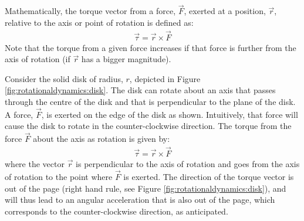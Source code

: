 Mathematically, the torque vector from a force, $\vec F$, exerted at a position, $\vec r$, relative to the axis or point of rotation is defined as:
\begin{align*}
\vec \tau = \vec r \times \vec F
\end{align*}
Note that the torque from a given force increases if that force is further from the axis of rotation (if $\vec r$ has a bigger magnitude). 

Consider the solid disk of radius, $r$, depicted in Figure \ref{fig:rotationaldynamics:disk}. The disk can rotate about an axis that passes through the centre of the disk and that is perpendicular to the plane of the disk. A force, $\vec F$, is exerted on the edge of the disk as shown.
Intuitively, that force will cause the disk to rotate in the counter-clockwise direction. The torque from the force $\vec F$ about the axis as rotation is given by:
\begin{align*}
\vec \tau = \vec r \times \vec F
\end{align*}
where the vector $\vec r$ is perpendicular to the axis of rotation and goes from the axis of rotation to the point where $\vec F$ is exerted. The direction of the torque vector is out of the page (right hand rule, see Figure \ref{fig:rotationaldynamics:disk}), and will thus lead to an angular acceleration that is also out of the page, which corresponds to the counter-clockwise direction, as anticipated. 

